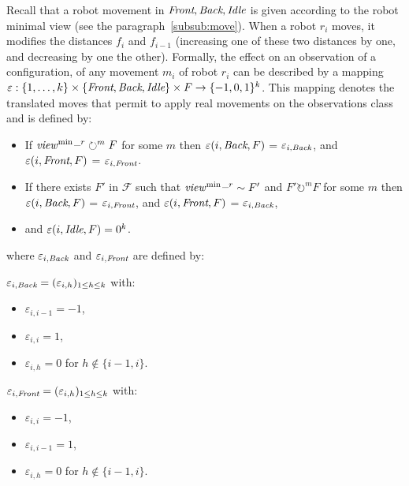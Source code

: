  Recall that a robot movement in $\textit{Front}, \textit{Back}, \textit{Idle}$ is given according to 
 the robot minimal view (see the paragraph~\ref{subsub:move}). 
 When a robot $r_i$ moves, it modifies the distances $f_i$ and $f_{i-1}$ 
 (increasing one of these two distances by one, and  decreasing by one 
 the other). Formally, the effect on an observation of a  configuration, 
 of any movement $m_i$ of robot $r_i$ can be described by a mapping 
 $\varepsilon:   \{1, \ldots, k\} \times \{\textit{Front}, \textit{Back}, \textit{Idle}\} \times F \to \{-1, 0, 1\}^k$.
 This mapping denotes the translated moves 
 that permit to apply real movements on the observations class and 
 is defined by:   \begin{itemize}
 \item If $\mathit{view}^{\min\_r} \circlearrowright ^m F$ for some $m$ then
		$\varepsilon(i, \textit{Back}, F)$ = $\varepsilon_{i, \textit{Back}}$, 
		and $\varepsilon(i, \textit{Front}, F)$ = $\varepsilon_{i, \textit{Front}}$.
\item If there exists $F'$ in $\mathcal{F}$ such that $\mathit{view}^{\min\_r} \sim F'$ 
and $F' \circlearrowright ^m F$ for some $m$ then
		$\varepsilon(i, \textit{Back}, F)$ = $\varepsilon_{i, \textit{Front}}$, 
		and $\varepsilon(i, \textit{Front}, F)$ = $\varepsilon_{i, \textit{Back}}$, 
\item and $\varepsilon(i, \textit{Idle}, F) = 0^k$.
 \end{itemize}
where $\varepsilon_{i, \textit{Back}}$ and $\varepsilon_{i, \textit{Front}}$ are defined by:  \\
\begin{minipage}{0.2\textwidth}
\end{minipage}
\hfill\begin{minipage}{0.4\textwidth}
$\varepsilon_{i, \textit{Back}}= (\varepsilon_{i, h})_{1\leq h\leq k}$ with:  
\begin{itemize}[noitemsep, topsep=0pt, parsep=0pt, partopsep=0pt]
\item $\varepsilon_{i, i-1}=-1$, 
\item $\varepsilon_{i, i}=1$, 
\item $\varepsilon_{i, h}=0$ for $h \notin \{i-1, i\}$.
\end{itemize}
\end{minipage}
\qquad
\begin{minipage}{0.4\textwidth}
$\varepsilon_{i, \textit{Front}}= (\varepsilon_{i, h})_{1\leq h\leq k}$ with:  
\begin{itemize}[noitemsep, topsep=0pt, parsep=0pt, partopsep=0pt]
\item $\varepsilon_{i, i}=-1$, 
\item $\varepsilon_{i, i-1}=1$, 
\item $\varepsilon_{i, h}=0$ for $h \notin \{i-1, i\}$. 
\end{itemize}
\end{minipage}

